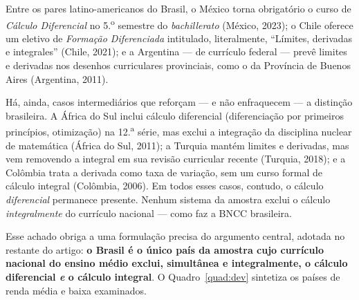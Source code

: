 \documentclass[12pt,a4paper,oneside]{article}
\begin{document}
Entre os pares latino-americanos do Brasil, o México torna obrigatório o
curso de \emph{Cálculo Diferencial} no 5.\textsuperscript{o} semestre do
\emph{bachillerato} (México, 2023); o Chile oferece um eletivo de
\emph{Formação Diferenciada} intitulado, literalmente, ``Límites,
derivadas e integrales'' (Chile, 2021); e a Argentina --- de currículo
federal --- prevê limites e derivadas nos desenhos curriculares
provinciais, como o da Província de Buenos Aires (Argentina, 2011).

Há, ainda, casos intermediários que reforçam --- e não enfraquecem --- a
distinção brasileira. A África do Sul inclui cálculo diferencial
(diferenciação por primeiros princípios, otimização) na
12.\textsuperscript{a} série, mas exclui a integração da disciplina
nuclear de matemática (África do Sul, 2011); a Turquia mantém limites e
derivadas, mas vem removendo a integral em sua revisão curricular recente
(Turquia, 2018); e a Colômbia trata a derivada como taxa de variação, sem
um curso formal de cálculo integral (Colômbia, 2006). Em todos esses
casos, contudo, o cálculo \emph{diferencial} permanece presente. Nenhum
sistema da amostra exclui o cálculo \emph{integralmente} do currículo
nacional --- como faz a BNCC brasileira.

Esse achado obriga a uma formulação precisa do argumento central, adotada
no restante do artigo: \textbf{o Brasil é o único país da amostra cujo
currículo nacional do ensino médio exclui, simultânea e integralmente, o
cálculo diferencial \emph{e} o cálculo integral}. O Quadro~\ref{quad:dev}
sintetiza os países de renda média e baixa examinados.
\end{document}
